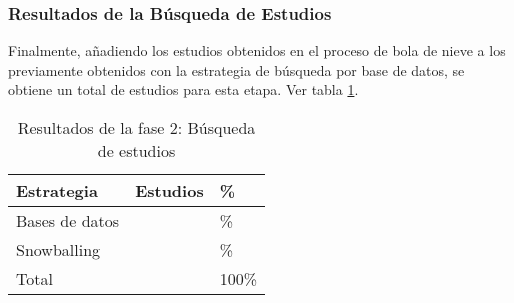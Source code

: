 \newcommand{\totalEtapaDos}{\fpeval{\screenTot + \snowballNewStudies}}
\newcommand{\dbPercentEtapa}{\fpeval{round(\screenTot*100/\totalEtapaDos,2)}}
\newcommand{\snowPercentEtapa}{\fpeval{round(\snowballNewStudies*100/\totalEtapaDos,2)}}

\subsubsection{Resultados de la Búsqueda de Estudios}\label{subsubsec:resultados-busqueda}

Finalmente, añadiendo los \snowballNewStudies{} estudios obtenidos en el proceso de bola de nieve a los \screenTot{} previamente obtenidos con la estrategia de búsqueda por base de datos, se obtiene un total de \totalEtapaDos{} estudios para esta etapa. Ver tabla \ref{table:resultados_etapa_2}.

\begin{table}[htbp]
    \centering
    \caption{Resultados de la fase 2: Búsqueda de estudios}
    \label{table:resultados_etapa_2}
    \renewcommand{\arraystretch}{1}  %
    \begin{tabular}{p{2.5cm}p{2.6cm}p{2.5cm}}
        \toprule
        \textbf{Estrategia} & \textbf{Estudios} & \textbf{\%} \\
        \midrule
        Bases de datos & \screenTot{} & \dbPercentEtapa{}\% \\
        \addlinespace[0.8em]
        Snowballing & \snowballNewStudies{} & \snowPercentEtapa{}\% \\
        \addlinespace[0.8em]
        Total & \totalEtapaDos & 100\% \\
        \bottomrule
    \end{tabular}
\end{table}
